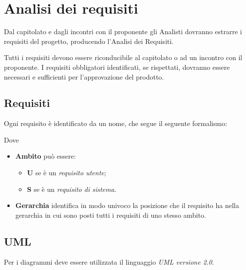 \section{Analisi dei requisiti}

Dal capitolato e dagli incontri con il proponente gli Analisti dovranno estrarre i requisiti del progetto, producendo l'Analisi dei Requisiti.

Tutti i requisiti devono essere riconducibile al capitolato o ad un incontro con il proponente. I requisiti obbligatori identificati, se rispettati, dovranno essere necessari e sufficienti per l'approvazione del prodotto.

\subsection{Requisiti}

Ogni requisito è identificato da un nome, che segue il seguente formalismo:
\begin{center}
\end{center}

Dove
\begin{itemize}
 \item \textbf{Ambito} può essere:
	\begin{itemize}
	 \item \textbf{U} se è un \emph{requisito utente};
	 \item \textbf{S} se è un \emph{requisito di sistema}.
	\end{itemize}

 \item \textbf{Gerarchia} identifica in modo univoco la posizione che il requisito ha nella gerarchia in cui sono posti tutti i requisiti di uno stesso ambito.
\end{itemize}

\subsection{UML}

Per i diagrammi deve essere utilizzata il linguaggio \emph{UML versione 2.0}.